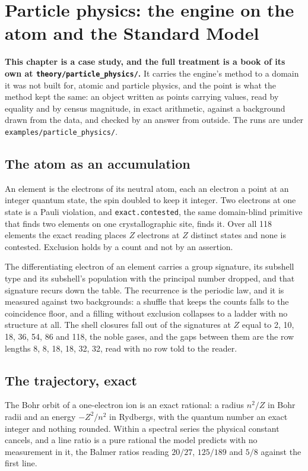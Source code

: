 \chapter{Particle physics: the engine on the atom and the Standard Model}

\textbf{This chapter is a case study, and the full treatment is a book of its own at
\texttt{theory/\allowbreak{}particle\_physics/}.} It carries the engine's method to a domain it was not
built for, atomic and particle physics, and the point is what the method kept the same: an object
written as points carrying values, read by equality and by census magnitude, in exact arithmetic,
against a background drawn from the data, and checked by an answer from outside. The runs are under
\texttt{examples/\allowbreak{}particle\_physics/}.

\section{The atom as an accumulation}

An element is the electrons of its neutral atom, each an electron a point at an integer quantum state,
the spin doubled to keep it integer. Two electrons at one state is a Pauli violation, and
\texttt{exact.contested}, the same domain-blind primitive that finds two elements on one
crystallographic site, finds it. Over all 118 elements the exact reading places $Z$ electrons at $Z$
distinct states and none is contested. Exclusion holds by a count and not by an assertion.

The differentiating electron of an element carries a group signature, its subshell type and its
subshell's population with the principal number dropped, and that signature recurs down the table. The
recurrence is the periodic law, and it is measured against two backgrounds: a shuffle that keeps the
counts falls to the coincidence floor, and a filling without exclusion collapses to a ladder with no
structure at all. The shell closures fall out of the signatures at $Z$ equal to 2, 10, 18, 36, 54, 86
and 118, the noble gases, and the gaps between them are the row lengths 8, 8, 18, 18, 32, 32, read with
no row told to the reader.

\section{The trajectory, exact}

The Bohr orbit of a one-electron ion is an exact rational: a radius $n^2/Z$ in Bohr radii and an energy
$-Z^2/n^2$ in Rydbergs, with the quantum number an exact integer and nothing rounded. Within a spectral
series the physical constant cancels, and a line ratio is a pure rational the model predicts with no
measurement in it, the Balmer ratios reading $20/27$, $125/189$ and $5/8$ against the first line.


